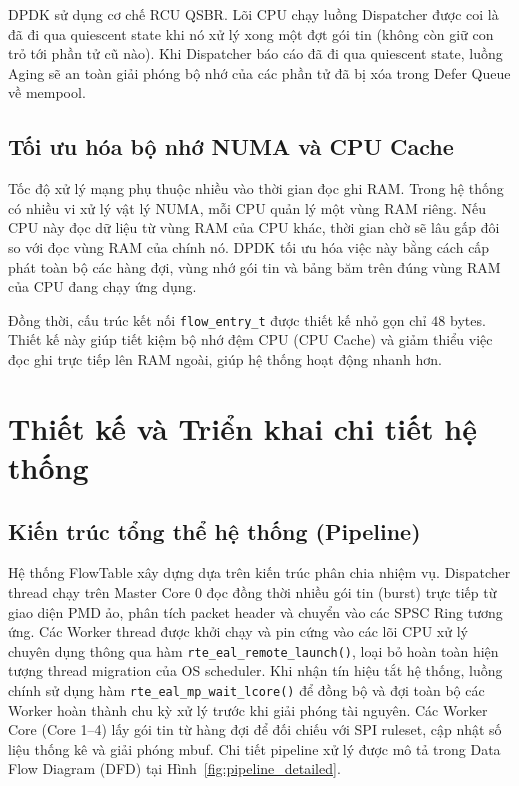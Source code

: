 \documentclass[12pt,a4paper,twoside]{report}
\begin{document}
DPDK sử dụng cơ chế RCU QSBR. Lõi CPU chạy luồng Dispatcher được coi là đã đi qua quiescent state khi nó xử lý xong một đợt gói tin (không còn giữ con trỏ tới phần tử cũ nào). Khi Dispatcher báo cáo đã đi qua quiescent state, luồng Aging sẽ an toàn giải phóng bộ nhớ của các phần tử đã bị xóa trong Defer Queue về mempool.

\subsection{Tối ưu hóa bộ nhớ NUMA và CPU Cache}
Tốc độ xử lý mạng phụ thuộc nhiều vào thời gian đọc ghi RAM. Trong hệ thống có nhiều vi xử lý vật lý NUMA, mỗi CPU quản lý một vùng RAM riêng. Nếu CPU này đọc dữ liệu từ vùng RAM của CPU khác, thời gian chờ sẽ lâu gấp đôi so với đọc vùng RAM của chính nó. DPDK tối ưu hóa việc này bằng cách cấp phát toàn bộ các hàng đợi, vùng nhớ gói tin và bảng băm trên đúng vùng RAM của CPU đang chạy ứng dụng.

Đồng thời, cấu trúc kết nối \texttt{flow\_entry\_t} được thiết kế nhỏ gọn chỉ $48$ bytes. Thiết kế này giúp tiết kiệm bộ nhớ đệm CPU (CPU Cache) và giảm thiểu việc đọc ghi trực tiếp lên RAM ngoài, giúp hệ thống hoạt động nhanh hơn.

\newpage
\section{Thiết kế và Triển khai chi tiết hệ thống}

\subsection{Kiến trúc tổng thể hệ thống (Pipeline)}
Hệ thống FlowTable xây dựng dựa trên kiến trúc phân chia nhiệm vụ. Dispatcher thread chạy trên Master Core 0 đọc đồng thời nhiều gói tin (burst) trực tiếp từ giao diện PMD ảo, phân tích packet header và chuyển vào các SPSC Ring tương ứng. Các Worker thread được khởi chạy và pin cứng vào các lõi CPU xử lý chuyên dụng thông qua hàm \texttt{rte\_eal\_remote\_launch()}, loại bỏ hoàn toàn hiện tượng thread migration của OS scheduler. Khi nhận tín hiệu tắt hệ thống, luồng chính sử dụng hàm \texttt{rte\_eal\_mp\_wait\_lcore()} để đồng bộ và đợi toàn bộ các Worker hoàn thành chu kỳ xử lý trước khi giải phóng tài nguyên. Các Worker Core (Core 1--4) lấy gói tin từ hàng đợi để đối chiếu với SPI ruleset, cập nhật số liệu thống kê và giải phóng mbuf. Chi tiết pipeline xử lý được mô tả trong Data Flow Diagram (DFD) tại Hình~\ref{fig:pipeline_detailed}.
\end{document}
